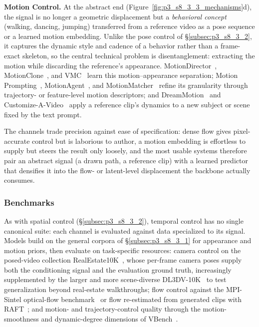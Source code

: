 \noindent\textbf{Motion Control.} At the abstract end (Figure~\ref{fig:p3_s8_3_3_mechanisms}d), the signal is no longer a geometric displacement but a \emph{behavioral concept} (walking, dancing, jumping) transferred from a reference video as a pose sequence or a learned motion embedding. Unlike the pose control of §\ref{subsec:p3_s8_3_2}, it captures the dynamic style and cadence of a behavior rather than a frame-exact skeleton, so the central technical problem is disentanglement: extracting the motion while discarding the reference's appearance. MotionDirector~\cite{zhao2024motiondirector}, MotionClone~\cite{ling2024motionclone}, and VMC~\cite{jeong2024vmc} learn this motion--appearance separation; Motion Prompting~\cite{geng2025motion}, MotionAgent~\cite{liao2025motionagent}, and MotionMatcher~\cite{wu2025motionmatcher} refine its granularity through trajectory- or feature-level motion descriptors; and DreamMotion~\cite{jeong2024dreammotion} and Customize-A-Video~\cite{ren2024customize} apply a reference clip's dynamics to a new subject or scene fixed by the text prompt.

The channels trade precision against ease of specification: dense flow gives pixel-accurate control but is laborious to author, a motion embedding is effortless to supply but steers the result only loosely, and the most usable systems therefore pair an abstract signal (a drawn path, a reference clip) with a learned predictor that densifies it into the flow- or latent-level displacement the backbone actually consumes.

\subsubsection{Benchmarks}
\label{subsubsec:p3_s8_3_3_benchmarks}
As with spatial control (§\ref{subsec:p3_s8_3_2}), temporal control has no single canonical suite: each channel is evaluated against data specialized to its signal.
Models build on the general corpora of §\ref{subsec:p3_s8_3_1} for appearance and motion priors, then evaluate on task-specific resources: camera control on the posed-video collection RealEstate10K~\cite{zhou2018stereo}, whose per-frame camera poses supply both the conditioning signal and the evaluation ground truth, increasingly supplemented by the larger and more scene-diverse DL3DV-10K~\cite{ling2024dl3dv} to test generalization beyond real-estate walkthroughs; flow control against the MPI-Sintel optical-flow benchmark~\cite{sintel} or flow re-estimated from generated clips with RAFT~\cite{teed2020raft}; and motion- and trajectory-control quality through the motion-smoothness and dynamic-degree dimensions of VBench~\cite{huang2023vbench}.

